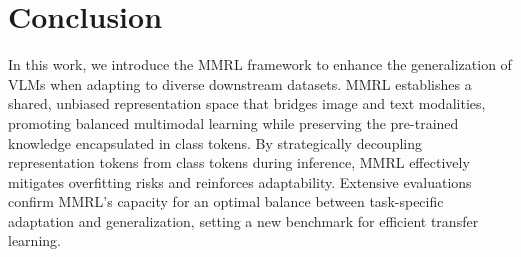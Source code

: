 \section{Conclusion}
In this work, we introduce the MMRL framework to enhance the generalization of VLMs when adapting to diverse downstream datasets. MMRL establishes a shared, unbiased representation space that bridges image and text modalities, promoting balanced multimodal learning while preserving the pre-trained knowledge encapsulated in class tokens. By strategically decoupling representation tokens from class tokens during inference, MMRL effectively mitigates overfitting risks and reinforces adaptability. Extensive evaluations confirm MMRL’s capacity for an optimal balance between task-specific adaptation and generalization, setting a new benchmark for efficient transfer learning. 
